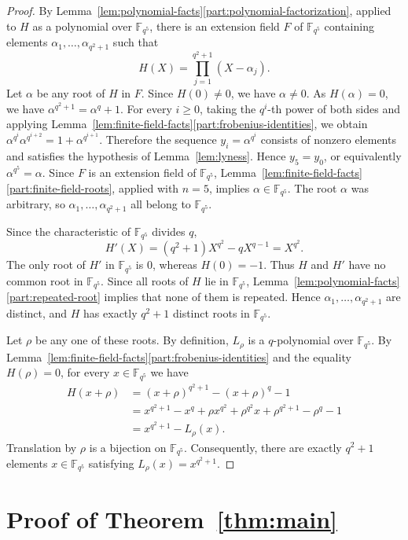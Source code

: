 \documentclass[12pt]{article}
\numberwithin{equation}{section}
\theoremstyle{definition}
\newcommand{\F}{\mathbb F}
\begin{document}
\begin{proof}
By Lemma~\ref{lem:polynomial-facts}\ref{part:polynomial-factorization}, applied to $H$ as a polynomial over $\F_{q^5}$, there is an extension field $F$ of $\F_{q^5}$ containing elements $\alpha_1,\ldots,\alpha_{q^2+1}$ such that
\[
        H(X)=\prod_{j=1}^{q^2+1}(X-\alpha_j).
\]
Let $\alpha$ be any root of $H$ in $F$. Since $H(0)\ne0$, we have $\alpha\ne0$. As $H(\alpha)=0$, we have $\alpha^{q^2+1}=\alpha^q+1$.
For every $i\ge0$, taking the $q^i$-th power of both sides and applying Lemma~\ref{lem:finite-field-facts}\ref{part:frobenius-identities}, we obtain $\alpha^{q^i}\alpha^{q^{i+2}}=1+\alpha^{q^{i+1}}$. Therefore the sequence $y_i=\alpha^{q^i}$ consists of nonzero elements and satisfies the hypothesis of Lemma~\ref{lem:lyness}. Hence $y_5=y_0$, or equivalently $\alpha^{q^5}=\alpha$. Since $F$ is an extension field of $\F_{q^5}$, Lemma~\ref{lem:finite-field-facts}\ref{part:finite-field-roots}, applied with $n=5$, implies $\alpha\in\F_{q^5}$. The root $\alpha$ was arbitrary, so $\alpha_1,\ldots,\alpha_{q^2+1}$ all belong to $\F_{q^5}$.

Since the characteristic of $\F_{q^5}$ divides $q$,
\[
        H'(X)=(q^2+1)X^{q^2}-qX^{q-1}=X^{q^2}.
\]
The only root of $H'$ in $\F_{q^5}$ is $0$, whereas $H(0)=-1$. Thus $H$ and $H'$ have no common root in $\F_{q^5}$. Since all roots of $H$ lie in $\F_{q^5}$, Lemma~\ref{lem:polynomial-facts}\ref{part:repeated-root} implies that none of them is repeated. Hence $\alpha_1,\ldots,\alpha_{q^2+1}$ are distinct, and $H$ has exactly $q^2+1$ distinct roots in $\F_{q^5}$.

Let $\rho$ be any one of these roots. By definition, $L_\rho$ is a $q$-polynomial over $\F_{q^5}$. By Lemma~\ref{lem:finite-field-facts}\ref{part:frobenius-identities} and the equality $H(\rho)=0$, for every $x\in\F_{q^5}$ we have
\begin{align*}
 H(x+\rho)
 &=(x+\rho)^{q^2+1}-(x+\rho)^q-1\\
 &=x^{q^2+1}-x^q+\rho x^{q^2}+\rho^{q^2}x
   +\rho^{q^2+1}-\rho^q-1\\
 &=x^{q^2+1}-L_\rho(x).
\end{align*}
Translation by $\rho$ is a bijection on $\F_{q^5}$. Consequently, there are exactly $q^2+1$ elements $x\in\F_{q^5}$ satisfying $L_\rho(x)=x^{q^2+1}$.
\end{proof}

\section{Proof of Theorem~\ref{thm:main}}\label{sec:construction}
\end{document}
